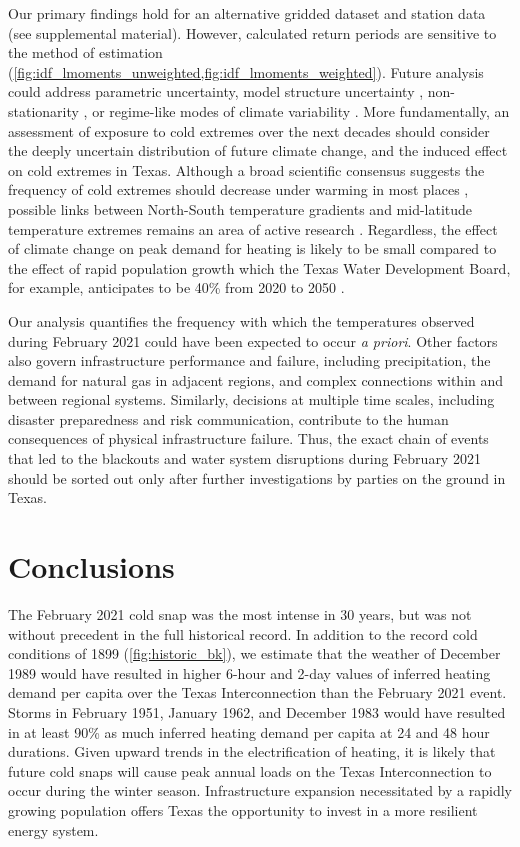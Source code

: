 \documentclass[12pt]{iopart}
\begin{document}
Our primary findings hold for an alternative gridded dataset and station data (see supplemental material).
However, calculated return periods are sensitive to the method of estimation (\cref{fig:idf_lmoments_unweighted,fig:idf_lmoments_weighted}).
Future analysis could address parametric uncertainty, model structure uncertainty \cite{wong_floodrisk:2018}, non-stationarity \cite{Milly:2008dg}, or regime-like modes of climate variability \cite{DossGollin:2019}.
More fundamentally, an assessment of exposure to cold extremes over the next decades should consider the deeply uncertain distribution of future climate change, and the induced effect on cold extremes in Texas.
Although a broad scientific consensus suggests the frequency of cold extremes should decrease under warming in most places \cite{ipcc_ar5:2014}, possible links between North-South temperature gradients and mid-latitude temperature extremes remains an area of active research \cite{Barnes:2013fp,Cohen:2014gx,Screen:2013ho,romanowsky_stratosphere:2019}.
Regardless, the effect of climate change on peak demand for heating is likely to be small compared to the effect of rapid population growth which the Texas Water Development Board, for example, anticipates to be 40\% from 2020 to 2050 \cite{texaswaterplan:2012}.

Our analysis quantifies the frequency with which the temperatures observed during February 2021 could have been expected to occur \emph{a priori}.
Other factors also govern infrastructure performance and failure, including precipitation, the demand for natural gas in adjacent regions, and complex connections within and between regional systems.
Similarly, decisions at multiple time scales, including disaster preparedness and risk communication, contribute to the human consequences of physical infrastructure failure.
Thus, the exact chain of events that led to the blackouts and water system disruptions during February 2021 should be sorted out only after further investigations by parties on the ground in Texas.

\section{Conclusions}

The February 2021 cold snap was the most intense in 30 years, but was not without precedent in the full historical record.
In addition to the record cold conditions of 1899 (\cref{fig:historic_bk}), we estimate that the weather of December 1989 would have resulted in higher 6-hour and 2-day values of inferred heating demand per capita over the Texas Interconnection than the February 2021 event.
Storms in February 1951, January 1962, and December 1983 would have resulted in at least 90\% as much inferred heating demand per capita at 24 and 48 hour durations.
Given upward trends in the electrification of heating, it is likely that future cold snaps will cause peak annual loads on the Texas Interconnection to occur during the winter season.
Infrastructure expansion necessitated by a rapidly growing population offers Texas the opportunity to invest in a more resilient energy system.
\end{document}
